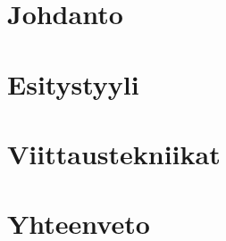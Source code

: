 
\glsaddall
{}
\setlength{\glsnamewidth}{0.25\textwidth}
\setlength{\glsdescwidth}{0.75\textwidth}
\renewcommand*{\glsgroupskip}{}


\printglossary[title={Lyhenteet ja merkinnät}]




\mainmatter


\chapter{Johdanto}
\label{ch:johdanto}



\chapter{Esitystyyli}
\label{ch:esitystyyli}


\chapter{Viittaustekniikat}
\label{ch:viittaustekniikat}



\chapter{Yhteenveto}
\label{ch:yhteenveto}




